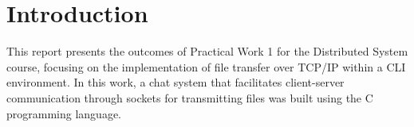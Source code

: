 \section{Introduction}

This report presents the outcomes of Practical Work 1 for the Distributed System course, focusing on the implementation of file transfer over TCP/IP within a CLI environment. In this work, a chat system that facilitates client-server communication through sockets for transmitting files was built using the C programming language.